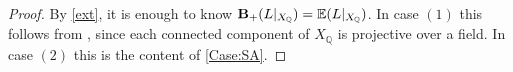 \begin{proof}

	By \autoref{ext}, it is enough to know $\mathbf{B}_{+}(L|_{X_{\mathbb{Q}}})=\mathbb{E}(L|_{X_{\mathbb{Q}}})$. In case $(1)$ this follows from \cite[Theorem 1.3]{birkar2017augmented}, since each connected component of $X_{\mathbb{Q}}$ is projective over a field. In case $(2)$ this is the content of \autoref{Case:SA}.
\end{proof}






%

